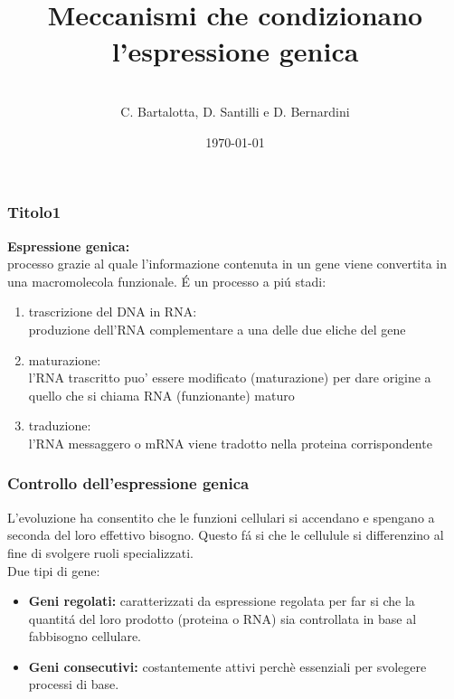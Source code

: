 \documentclass[hyperref={pdfpagelabels=false}]{beamer}
\title{\\Meccanismi che condizionano l'espressione genica\\}
\author{\\ C. Bartalotta, D. Santilli e D. Bernardini}
\date{\today}
\begin{document}
\begin{frame}
\titlepage
\end{frame} 

\begin{frame}\frametitle{Titolo1}
\textbf{Espressione genica:}\\
processo grazie al quale l'informazione contenuta in un gene viene convertita in una macromolecola funzionale.
\'E un processo a pi\'u stadi:\pause 
\begin{enumerate}
\item trascrizione del DNA in RNA:\\
produzione dell'RNA complementare a una delle due eliche del gene  \pause 
\item maturazione:\\
l'RNA trascritto puo' essere modificato (maturazione) per dare origine a quello che si chiama RNA (funzionante) maturo \pause 
\item traduzione:\\
l'RNA messaggero o mRNA viene tradotto nella proteina corrispondente
\end{enumerate}
\end{frame}

\begin{frame}\frametitle{Controllo dell'espressione genica}
L'evoluzione ha consentito che le funzioni cellulari si accendano e spengano a seconda del loro effettivo bisogno. Questo f\'a si che le cellulule si differenzino al fine di svolgere ruoli specializzati.
\\
Due tipi di gene:

\begin{itemize}
\item \textbf{Geni regolati:}  caratterizzati da espressione regolata per far si che la quantit\'a del loro prodotto (proteina o RNA) sia controllata in base al fabbisogno cellulare.
\item \textbf{Geni consecutivi:} costantemente attivi perchè essenziali per svolegere processi di base.
\end{itemize}
\end{frame}
\end{document}

